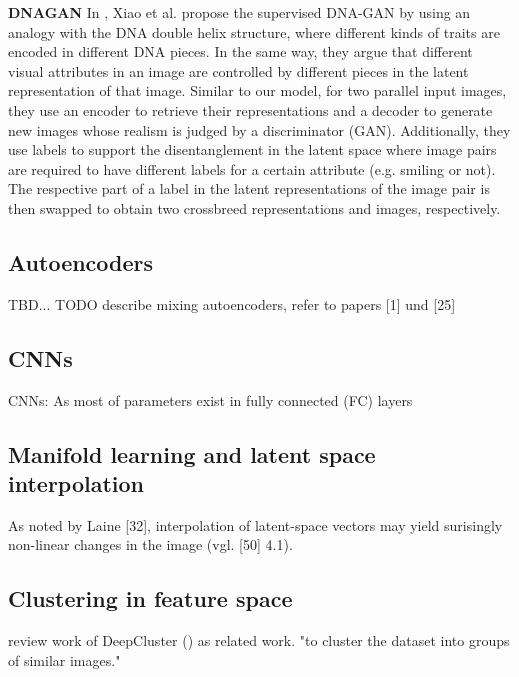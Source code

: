 \documentclass[12pt,a4paper]{article}
\begin{document}
\par \textbf{DNAGAN} In \cite{1711.05415}, Xiao et al. propose the supervised DNA-GAN by using an analogy with the DNA double helix structure, where different kinds of traits are encoded in different DNA pieces. In the same way, they argue that different visual attributes in an image are controlled by different pieces in the latent representation of that image. Similar to our model, for two parallel input images, they use an encoder to retrieve their representations and a decoder to generate new images whose realism is judged by a discriminator (GAN). Additionally, they use labels to support the disentanglement in the latent space where image pairs are required to have different labels for a certain attribute (e.g. smiling or not). The respective part of a label in the latent representations of the image pair is then swapped to obtain two crossbreed representations and images, respectively.


\subsection{Autoencoders}
TBD...
TODO describe mixing autoencoders, refer to papers [1] und [25]

\subsection{CNNs}
\par CNNs: As most of parameters exist in fully connected (FC) layers


\subsection{Manifold learning and latent space interpolation}
As noted by Laine [32], interpolation of latent-space vectors may yield surisingly non-linear changes in the image (vgl. [50] 4.1).

\subsection{Clustering in feature space}
review work of DeepCluster (\cite{1807.05520}) as related work.
"to cluster the dataset into groups of similar images."
\end{document}
